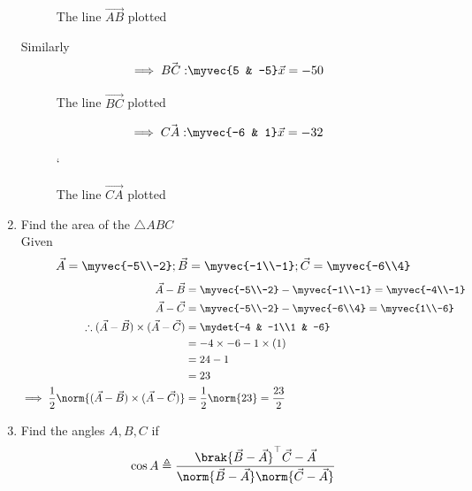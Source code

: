 \documentclass[11pt]{book}
\begin{document}
\begin{enumerate}[label=\thesection.\arabic*.,ref=\thesection.\theenumi]
\begin{figure}[H]
\caption{ The line $\vec{AB}$ plotted}
\label{fig:line AB}
\end{figure}
Similarly
\begin{align}
	\implies
	\vec{BC:} \myvec{5 & -5}\vec{x} &=-50
\end{align}
\begin{figure}[H]
\caption{ The line $\vec{BC}$ plotted}
\label{fig:line BC}
\end{figure}
\begin{align}
	\implies \vec{CA:} \myvec{-6 & 1}\vec{x} &= -32
\end{align}
\begin{figure}[H]
	`
\caption{ The line $\vec{CA}$ plotted}
\label{fig:line CA}
\end{figure}
\item Find the area of the $\triangle ABC$
	\solution\\
Given
\begin{align}
 \vec{A} = \myvec{-5\\-2};
 \vec{B} = \myvec{-1\\-1};
 \vec{C} = \myvec{-6\\4}
 \end{align}
 \begin{align}
 \vec{A}-\vec{B} &= \myvec{-5\\-2} - \myvec{-1\\-1} = \myvec{-4\\-1}\\
 \vec{A}-\vec{C} &= \myvec{-5\\-2} - \myvec{-6\\4} = \myvec{1\\-6}\\
\therefore(\vec{A}-\vec{B})\times(\vec{A}-\vec{C}) 
 &= \mydet{-4 & -1\\1 & -6}\\
 &= -4 \times -6 - 1 \times (1)\\ &= 24 - 1\\ &=23 \\
 \implies\frac{1}{2}\norm{(\vec{A}-\vec{B})\times(\vec{A}-\vec{C})} &= \frac{1}{2}\norm{23}= \frac{23}{2}
\end{align}
\item Find the angles $A, B, C$ if 
    \label{prop:angle2d}
  \begin{align}
    \label{eq:angle2d}
   \cos A \triangleq 
\frac{\brak{\vec{B}-\vec{A}}^{\top}{\vec{C}-\vec{A}}}{\norm{\vec{B}-\vec{A}}\norm{\vec{C}-\vec{A}}}

\end{align}
\end{enumerate}
\end{document}
